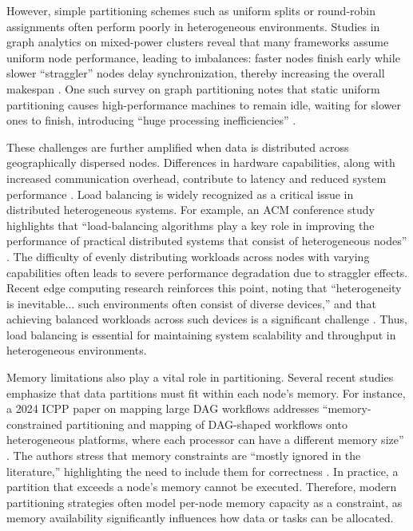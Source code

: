 \documentclass{article}
\begin{document}
However, simple partitioning schemes such as uniform splits or round-robin assignments often perform poorly in heterogeneous environments. Studies in graph analytics on mixed-power clusters reveal that many frameworks assume uniform node performance, leading to imbalances: faster nodes finish early while slower ``straggler'' nodes delay synchronization, thereby increasing the overall makespan \cite{gptclaim7_8}. One such survey on graph partitioning notes that static uniform partitioning causes high-performance machines to remain idle, waiting for slower ones to finish, introducing ``huge processing inefficiencies'' \cite{gptclaim7_8}.

These challenges are further amplified when data is distributed across geographically dispersed nodes. Differences in hardware capabilities, along with increased communication overhead, contribute to latency and reduced system performance \cite{yoon_optimal_2014}. Load balancing is widely recognized as a critical issue in distributed heterogeneous systems. For example, an ACM conference study highlights that ``load-balancing algorithms play a key role in improving the performance of practical distributed systems that consist of heterogeneous nodes'' \cite{gptclaim5}. The difficulty of evenly distributing workloads across nodes with varying capabilities often leads to severe performance degradation due to straggler effects. Recent edge computing research reinforces this point, noting that ``heterogeneity is inevitable... such environments often consist of diverse devices,'' and that achieving balanced workloads across such devices is a significant challenge \cite{gptclaim6}. Thus, load balancing is essential for maintaining system scalability and throughput in heterogeneous environments.

Memory limitations also play a vital role in partitioning. Several recent studies emphasize that data partitions must fit within each node’s memory. For instance, a 2024 ICPP paper on mapping large DAG workflows addresses ``memory-constrained partitioning and mapping of DAG-shaped workflows onto heterogeneous platforms, where each processor can have a different memory size'' \cite{gptclaim14_15}. The authors stress that memory constraints are ``mostly ignored in the literature,'' highlighting the need to include them for correctness \cite{gptclaim14_15}. In practice, a partition that exceeds a node’s memory cannot be executed. Therefore, modern partitioning strategies often model per-node memory capacity as a constraint, as memory availability significantly influences how data or tasks can be allocated.
\end{document}
